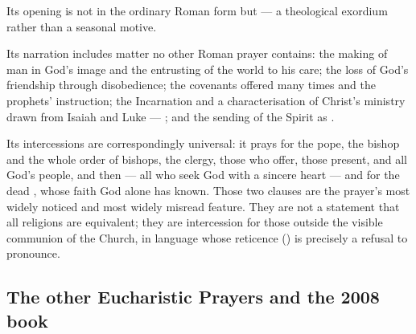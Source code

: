 Its opening is not  in the ordinary Roman
form but  --- a theological exordium rather than a seasonal motive.

Its narration includes matter no other Roman prayer contains: the making of man in God's image
and the entrusting of the world to his care; the loss of God's friendship through disobedience;
the covenants offered many times and the prophets' instruction; the Incarnation and a
characterisation of Christ's ministry drawn from Isaiah and Luke --- ; and the sending of
the Spirit as .

Its intercessions are correspondingly universal: it prays for the pope, the bishop and the whole
order of bishops, the clergy, those who offer, those present, and all God's people, and then
 --- all who seek God with a sincere heart --- and
for the dead , whose faith God alone has known. Those
two clauses are the prayer's most widely noticed and most widely misread feature. They are not a
statement that all religions are equivalent; they are intercession for those outside the visible
communion of the Church, in language whose reticence () is precisely
a refusal to pronounce.

\subsection{The other Eucharistic Prayers and the 2008 book}

